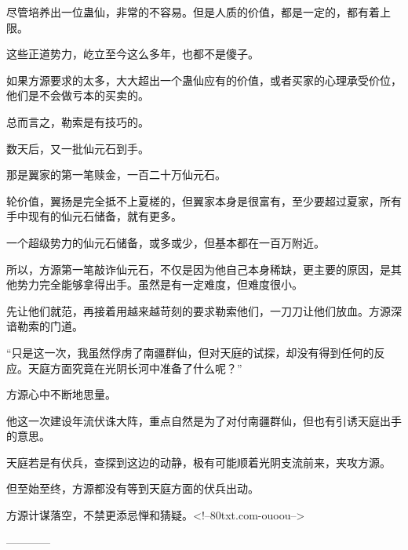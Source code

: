 \begin{this_body}
尽管培养出一位蛊仙，非常的不容易。但是人质的价值，都是一定的，都有着上限。

这些正道势力，屹立至今这么多年，也都不是傻子。

如果方源要求的太多，大大超出一个蛊仙应有的价值，或者买家的心理承受价位，他们是不会做亏本的买卖的。

总而言之，勒索是有技巧的。

数天后，又一批仙元石到手。

那是翼家的第一笔赎金，一百二十万仙元石。

轮价值，翼扬是完全抵不上夏槎的，但翼家本身是很富有，至少要超过夏家，所有手中现有的仙元石储备，就有更多。

一个超级势力的仙元石储备，或多或少，但基本都在一百万附近。

所以，方源第一笔敲诈仙元石，不仅是因为他自己本身稀缺，更主要的原因，是其他势力完全能够拿得出手。虽然是有一定难度，但难度很小。

先让他们就范，再接着用越来越苛刻的要求勒索他们，一刀刀让他们放血。方源深谙勒索的门道。

“只是这一次，我虽然俘虏了南疆群仙，但对天庭的试探，却没有得到任何的反应。天庭方面究竟在光阴长河中准备了什么呢？”

方源心中不断地思量。

他这一次建设年流伏诛大阵，重点自然是为了对付南疆群仙，但也有引诱天庭出手的意思。

天庭若是有伏兵，查探到这边的动静，极有可能顺着光阴支流前来，夹攻方源。

但至始至终，方源都没有等到天庭方面的伏兵出动。

方源计谋落空，不禁更添忌惮和猜疑。<!--80txt.com-ouoou-->

------------

\end{this_body}

